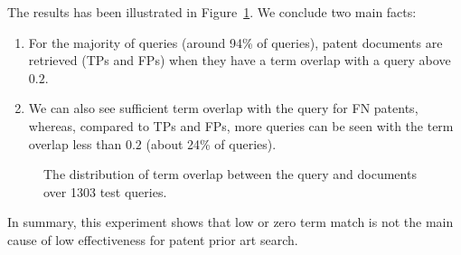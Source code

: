 The results has been illustrated in Figure~\ref{fig:overlap}. We conclude two main facts:
\begin{enumerate}
\item For the majority of queries (around 94\% of queries), patent documents are retrieved (TPs and FPs) when they have a term overlap with a query above $ 0.2 $.
\item We can also see sufficient term overlap with the query for FN patents, whereas, compared to TPs and FPs, more queries can be seen with the term overlap less than $ 0.2 $ (about 24\% of queries). 
\end{enumerate}
 
\begin{figure}[t!]
\begin{centering}
\par\end{centering}

\protect\caption{The distribution of term overlap between the query and documents over 1303 test queries.}
\label{fig:overlap}
\end{figure}
In summary, this experiment shows that low or zero term match is not the main cause of low effectiveness for patent prior art search.

